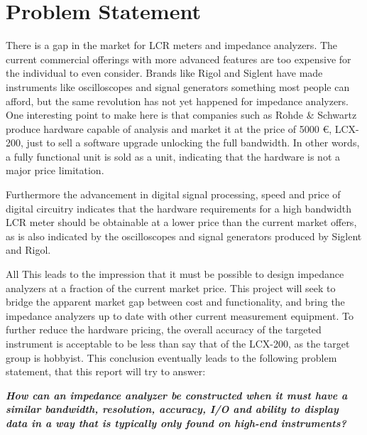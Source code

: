 \chapter{Problem Statement} \label{ch:ProblemStatement}
There is a gap in the market for LCR meters and impedance analyzers. The current commercial offerings with more advanced features are too expensive for the individual to even consider. Brands like Rigol and Siglent have made instruments like oscilloscopes and signal generators something most people can afford, but the same revolution has not yet happened for impedance analyzers. One interesting point to make here is that companies such as Rohde \& Schwartz produce hardware capable of  analysis and market it at the price of 5000 €, LCX-200, just to sell a software upgrade unlocking the full  bandwidth. In other words, a fully functional  unit is sold as a  unit, indicating that the hardware is not a major price limitation. 

Furthermore the advancement in digital signal processing, speed and price of digital circuitry indicates that the hardware requirements for a high bandwidth LCR meter should be obtainable at a lower price than the current market offers, as is also indicated by the oscilloscopes and signal generators produced by Siglent and Rigol.

All This leads to the impression that it must be possible to design impedance analyzers at a fraction of the current market price. This project will seek to bridge the apparent market gap between cost and functionality, and bring the impedance analyzers up to date with other current measurement equipment. To further reduce the hardware pricing, the overall accuracy of the targeted instrument is acceptable to be less than say that of the LCX-200, as the target group is hobbyist. This conclusion eventually leads to the following problem statement,
that this report will try to answer:

\textbf{\textit{How can an impedance analyzer be constructed when it must have a similar bandwidth, resolution, accuracy, I/O and ability to display data in a way that is typically only found on high-end instruments?}}